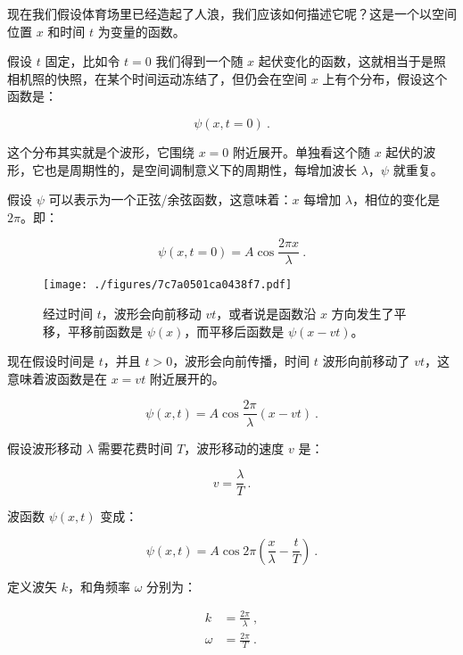 现在我们假设体育场里已经造起了人浪，我们应该如何描述它呢？这是一个以空间位置 $x$ 和时间 $t$ 为变量的函数。

假设 $t$ 固定，比如令 $t = 0$ 我们得到一个随 $x$ 起伏变化的函数，这就相当于是照相机照的快照，在某个时间运动冻结了，但仍会在空间 $x$ 上有个分布，假设这个函数是：

\begin{equation}
\psi (x, t = 0) ~.
\end{equation}

这个分布其实就是个波形，它围绕 $x = 0$ 附近展开。单独看这个随 $x$ 起伏的波形，它也是周期性的，是空间调制意义下的周期性，每增加波长 $\lambda$，$\psi$ 就重复。

假设 $\psi$ 可以表示为一个正弦/余弦函数，这意味着：$x$ 每增加 $\lambda$，相位的变化是 $2 \pi$。即：

\begin{equation}
\psi (x, t = 0) = A \cos \frac{2 \pi x}{ \lambda}~.
\end{equation}

\begin{figure}[ht]
\centering
\texttt{[image: ./figures/7c7a0501ca0438f7.pdf]}
\caption{经过时间 $t$，波形会向前移动 $vt$，或者说是函数沿 $x$ 方向发生了平移，平移前函数是 $\psi(x)$，而平移后函数是 $\psi(x - vt)$。} \label{fig_AtomId_9}
\end{figure}

现在假设时间是 $t$，并且 $t > 0$，波形会向前传播，时间 $t$ 波形向前移动了 $vt$，这意味着波函数是在 $x = vt$ 附近展开的。

\begin{equation}
\psi(x,t) = A \cos \frac{2 \pi}{\lambda} \left( x - vt \right)~.
\end{equation}

假设波形移动 $\lambda$ 需要花费时间 $T$，波形移动的速度 $v$ 是：

\begin{equation}
v = \frac{\lambda}{ T }~.
\end{equation}

波函数 $\psi(x,t)$ 变成：

\begin{equation}
\psi(x, t) = A \cos   2\pi \left(  \frac{x}{\lambda} - \frac{t}{T}   \right)~.
\end{equation}

定义波矢 $k$，和角频率 $\omega$ 分别为：

\begin{equation}
\begin{aligned}
k &= \frac{2 \pi}{\lambda} ~,\\
\omega &= \frac{2 \pi}{T}~.
\end{aligned}
\end{equation}

